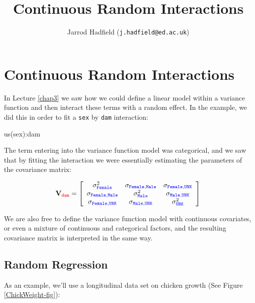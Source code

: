 \documentclass{article}
\title{Continuous Random Interactions}
\author{Jarrod Hadfield (\texttt{j.hadfield@ed.ac.uk})}
\begin{document}
\maketitle
\else
\chapter{Continuous Random Interactions}
\label{chap4}
\fi


In Lecture \ref{chap3} we saw how we could define a linear model within a variance function and then interact these terms with a random effect. In the example, we did this in order to fit a \texttt{sex} by \texttt{dam} interaction:

\begin{Schunk}
\begin{Soutput}
us(sex):dam
\end{Soutput}
\end{Schunk}

The term entering into the variance function model was categorical, and we saw that by fitting the interaction we were essentially estimating the parameters of the covariance matrix:   

\begin{displaymath}
{\bf V}_{{\color{red} \texttt{dam}}}=
\left[
\begin{array}{ccc}
\sigma^{2}_{\color{blue}\texttt{Female}}&\sigma_{\color{blue}\texttt{Female}, \texttt{Male}}&\sigma_{\color{blue}\texttt{Female}, \texttt{UNK}}\\
\sigma_{\color{blue}\texttt{Female}, \texttt{Male}}&\sigma^{2}_{\color{blue}\texttt{Male}}&\sigma_{\color{blue}\texttt{Male}, \texttt{UNK}}\\
\sigma_{\color{blue}\texttt{Female}, \texttt{UNK}}&\sigma_{\color{blue}\texttt{Male}, \texttt{UNK}}&\sigma^{2}_{\color{blue}\texttt{UNK}}\\
\end{array}
\right]
\end{displaymath}

We are also free to define the variance function model with continuous covariates, or even a mixture of continuous and categorical factors, and the resulting covariance matrix is interpreted in the same way.

\section{Random Regression}

 As an example, we'll use a longitudinal data set on chicken growth (See Figure \ref{ChickWeight-fig}):
\end{document}
